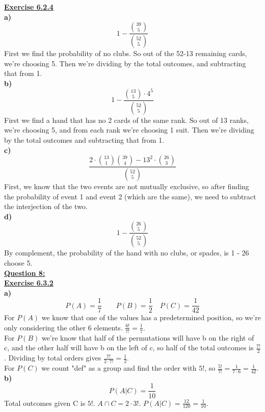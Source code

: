 \documentclass[12pt, letterpaper, twoside]{article}
\begin{document}
\break
\textbf{\underline{Exercise 6.2.4}}\\
\break
\textbf{a)}\\
\[1 - \frac{\binom{39}{5}}{\binom{52}{5}}\]
\indent First we find the probability of no clubs. So out of the 52-13 remaining cards, we're choosing 5. Then we're dividing by the total outcomes, and subtracting that from 1.\\
\break
\textbf{b)}\\
\[1 - \frac{\binom{13}{5}\cdot4^5}{\binom{52}{5}}\]
First we find a hand that has no 2 cards of the same rank. So out of 13 ranks, we're choosing 5, and from each rank we're choosing 1 suit. Then we're dividing by the total outcomes and subtracting that from 1.\\
\break
\textbf{c)}\\
\[\frac{2\cdot\binom{13}{1}\binom{39}{4} - 13^2 \cdot \binom{26}{3}}{\binom{52}{5}}\]
\indent First, we know that the two events are not mutually exclusive, so after finding the probability of event 1 and event 2 (which are the same), we need to subtract the interjection of the two.\\
\break
\textbf{d)}\\
\[1 - \frac{\binom{26}{5}}{\binom{52}{5}}\]
By complement, the probability of the hand with no clubs, or spades, is 1 - 26 choose 5.\\
\newpage\noindent\textbf{\underline{Question 8:}}\\
\break
\textbf{\underline{Exercise 6.3.2}}\\
\textbf{a)}\\
\[P(A) = \frac{1}{7} \qquad P(B) = \frac{1}{2} \quad P(C) = \frac{1}{42}\]
\indent For $P(A)$ we know that one of the values has a predetermined position, so we're only considering the other 6 elements. $\frac{6!}{7!} = \frac{1}{7}$.\\
\break
\indent For $P(B)$ we're know that half of the permutations will have b on the right of c, and the other half will have b on the left of c, so half of the total outcomes is $\frac{7!}{2}$. Dividing by total orders gives $\frac{7!}{2\cdot7!} = \frac{1}{2}$.\\
\break
For $P(C)$ we count "def" as a group and find the order with $5!$, so $\frac{5!}{7!} = \frac{1}{7\cdot6} = \frac{1}{42}$.\\
\break
\textbf{b)}\\
\[P(A|C) = \frac{1}{10}\]
\indent Total outcomes given C is $5!$. $A \cap C = 2\cdot3!$. $P(A|C) = \frac{12}{120} = \frac{1}{10}$.\\
\end{document}
